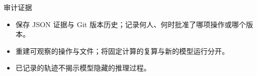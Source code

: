 \begin{frame}{审计证据}
\begin{center}
\resizebox{.94\textwidth}{!}{}
\end{center}
\begin{itemize}
\item 保存 JSON 证据与 Git 版本历史；记录何人、何时批准了哪项操作或哪个版本。
\item 重建可观察的操作与文件；将固定计算的复算与新的模型运行分开。
\item 已记录的轨迹不揭示模型隐藏的推理过程。
\end{itemize}
\end{frame}
